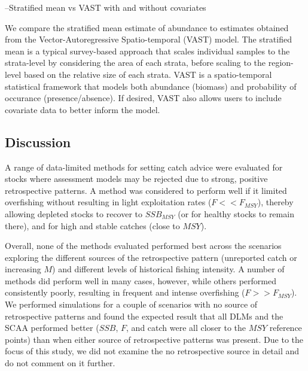 \documentclass[
  12pt,
]{article}
\begin{document}
--Stratified mean vs VAST with and without covariates

We compare the stratified mean estimate of abundance to estimates obtained from the Vector-Autoregressive Spatio-temporal (VAST) model. The stratified mean is a typical survey-based approach that scales individual samples to the strata-level by considering the area of each strata, before scaling to the region-level based on the relative size of each strata. VAST is a spatio-temporal statistical framework that models both abundance (biomass) and probability of occurance (presence/absence). If desired, VAST also allows users to include covariate data to better inform the model.

\hypertarget{discussion}{%
\subsection{Discussion}\label{discussion}}

A range of data-limited methods for setting catch advice were evaluated for stocks where assessment models may be rejected due to strong, positive retrospective patterns. A method was considered to perform well if it limited overfishing without resulting in light exploitation rates (\(F << F_{MSY}\)), thereby allowing depleted stocks to recover to \(SSB_{MSY}\) (or for healthy stocks to remain there), and for high and stable catches (close to \(MSY\)).

Overall, none of the methods evaluated performed best across the scenarios exploring the different sources of the retrospective pattern (unreported catch or increasing \(M\)) and different levels of historical fishing intensity. A number of methods did perform well in many cases, however, while others performed consistently poorly, resulting in frequent and intense overfishing (\(F>>F_{MSY}\)). We performed simulations for a couple of scenarios with no source of retrospective patterns and found the expected result that all DLMs and the SCAA performed better (\(SSB\), \(F\), and catch were all closer to the \(MSY\) reference points) than when either source of retrospective patterns was present. Due to the focus of this study, we did not examine the no retrospective source in detail and do not comment on it further.
\end{document}
